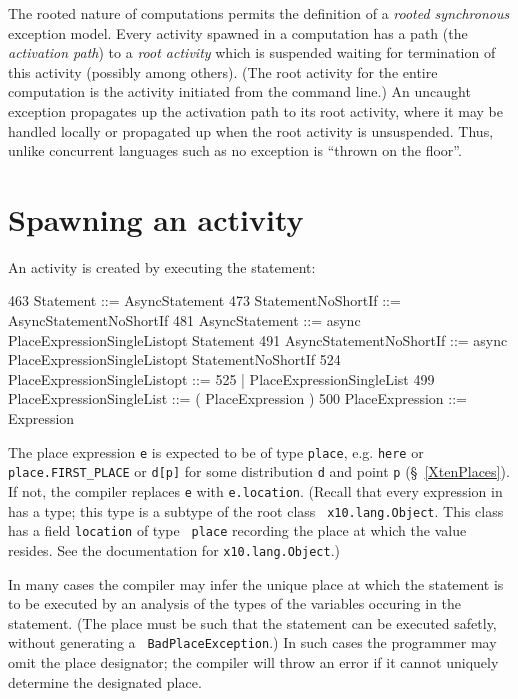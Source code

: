 The rooted nature of \Xten{} computations permits the definition of a
{\em rooted synchronous} exception model.  Every activity spawned in a
computation has a path (the {\em activation path}) to a {\em root
activity} which is suspended waiting for termination of this activity
(possibly among others). (The root activity for the entire computation
is the activity initiated from the command line.) An uncaught
exception propagates up the activation path to its root activity,
where it may be handled locally or propagated up when the root
activity is unsuspended. Thus, unlike concurrent languages such as \java{} no
exception is ``thrown on the floor''.

\section{Spawning an activity}\label{AsynchronousActivity}\label{AsyncActivity}
An activity is created by executing the statement:
\begin{x10}
463 Statement ::= AsyncStatement
473 StatementNoShortIf ::= AsyncStatementNoShortIf
481 AsyncStatement ::= 
      async PlaceExpressionSingleListopt Statement
491 AsyncStatementNoShortIf ::= 
      async PlaceExpressionSingleListopt StatementNoShortIf
524   PlaceExpressionSingleListopt ::=
525       | PlaceExpressionSingleList
499   PlaceExpressionSingleList ::= ( PlaceExpression )
500   PlaceExpression ::= Expression
\end{x10} 

The place expression {\tt e} is expected to be of type {\tt place},
e.g.{} {\tt here} or {\tt place.FIRST\_PLACE} or {\tt d[p]} for some
distribution {\tt d} and point {\tt p} (\S~\ref{XtenPlaces}).  
If not, the compiler replaces
{\tt e} with {\tt e.location}. (Recall that every expression in
\Xten{} has a type; this type is a subtype of the root class {\tt
x10.lang.Object}.  This class has a field {\tt location} of type {\tt
place} recording the place at which the value resides. See
the documentation for {\tt x10.lang.Object}.)

In many cases the compiler may infer the unique place at which the
statement is to be executed by an analysis of the types of the
variables occuring in the statement. (The place must be such that the
statement can be executed safetly, without generating a {\tt
BadPlaceException}.) In such cases the programmer may omit the place
designator; the compiler will throw an error if it cannot uniquely
determine the designated place.

